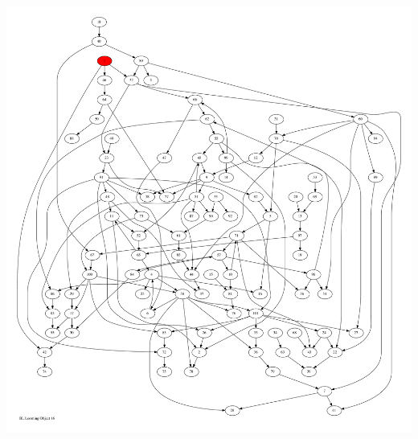 \documentclass{article}
\begin{document}
\newpage
\includegraphics[max height=\textheight,max width=\textwidth]{bl_looming_objs/bl_loom_obj16_pp.pdf}

\end{document}
